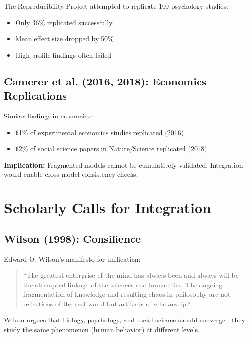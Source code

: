 The Reproducibility Project attempted to replicate 100 psychology studies:
\begin{itemize}
\item Only 36\% replicated successfully
\item Mean effect size dropped by 50\%
\item High-profile findings often failed
\end{itemize}

\subsection{Camerer et al. (2016, 2018): Economics Replications}

Similar findings in economics:
\begin{itemize}
\item 61\% of experimental economics studies replicated (2016)
\item 62\% of social science papers in Nature/Science replicated (2018)
\end{itemize}

\textbf{Implication:}
Fragmented models cannot be cumulatively validated. Integration would enable cross-model consistency checks.



\section{Scholarly Calls for Integration}
\label{sec:meta-calls}

\subsection{Wilson (1998): Consilience}

Edward O. Wilson's manifesto for unification:
\begin{quote}
``The greatest enterprise of the mind has always been and always will be the attempted linkage of the sciences and humanities. The ongoing fragmentation of knowledge and resulting chaos in philosophy are not reflections of the real world but artifacts of scholarship.''
\end{quote}

Wilson argues that biology, psychology, and social science should converge—they study the same phenomenon (human behavior) at different levels.

